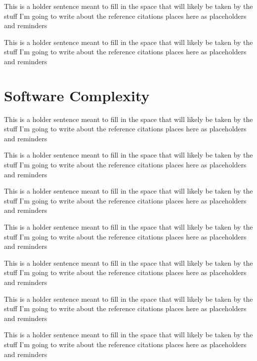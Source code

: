 \cite{zang2007towards}

This is a holder sentence meant to fill in the space that will likely be taken by the stuff I'm going to write about the reference citations places here as placeholders and reminders

\cite{mernik2005when}

This is a holder sentence meant to fill in the space that will likely be taken by the stuff I'm going to write about the reference citations places here as placeholders and reminders

\section{Software Complexity}

This is a holder sentence meant to fill in the space that will likely be taken by the stuff I'm going to write about the reference citations places here as placeholders and reminders

\cite{mccabe1976complexity}

This is a holder sentence meant to fill in the space that will likely be taken by the stuff I'm going to write about the reference citations places here as placeholders and reminders

\cite{gill1991cyclomatic}

This is a holder sentence meant to fill in the space that will likely be taken by the stuff I'm going to write about the reference citations places here as placeholders and reminders

\cite{weyuker1988evaluating}

This is a holder sentence meant to fill in the space that will likely be taken by the stuff I'm going to write about the reference citations places here as placeholders and reminders

\cite{mccabe1989design}

This is a holder sentence meant to fill in the space that will likely be taken by the stuff I'm going to write about the reference citations places here as placeholders and reminders

\cite{kearney1986software}

This is a holder sentence meant to fill in the space that will likely be taken by the stuff I'm going to write about the reference citations places here as placeholders and reminders

\cite{shao2003new}

This is a holder sentence meant to fill in the space that will likely be taken by the stuff I'm going to write about the reference citations places here as placeholders and reminders


